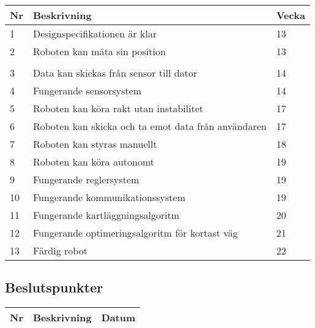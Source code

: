 \documentclass[11pt]{article}
\begin{document}
\begin{flushleft}
\begin{table}[h]
\begin{tabular}{|l|p{.75\linewidth}|l|}
Nr &
Beskrivning &
Vecka \\ \hline

1 &
Designspecifikationen är klar &
13\\ \hline

2 &
Roboten kan mäta sin position &
13 \\ \hline \\ \hline

3 &
Data kan skickas från sensor till dator&
14\\ \hline

4 &
Fungerande sensorsystem &
14 \\ \hline

5 &
Roboten kan köra rakt utan instabilitet &
17 \\ \hline

6 &
Roboten kan skicka och ta emot data från användaren&
17\\ \hline

7 &
Roboten kan styras manuellt &
18\\ \hline

8 &
Roboten kan köra autonomt &
19\\ \hline

9 &
Fungerande reglersystem  &
19 \\ \hline

10 &
Fungerande kommunikationssystem &
19\\ \hline

11 &
Fungerande kartläggningsalgoritm &
20\\ \hline

12 &
Fungerande optimeringsalgoritm för kortast väg &
21\\ \hline

13 &
Färdig robot &
22\\ \hline
 
\end{tabular}
\end{table}

\subsection{Beslutspunkter}
\begin{table}[h]
\begin{tabular}{|l|p{.75\linewidth}|l|} \hline

Nr &
Beskrivning &
Datum \\ \hline


\end{tabular}
\end{table}
\end{flushleft}
\end{document}
